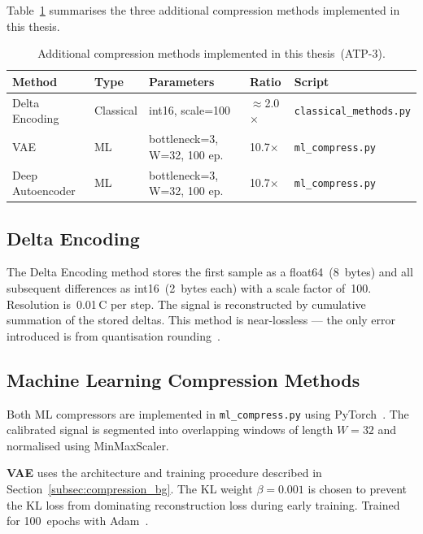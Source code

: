 Table~\ref{tab:compress_methods} summarises the three additional compression methods implemented in this thesis.

\begin{table}[H]
\centering
\caption{Additional compression methods implemented in this thesis~(ATP-3).}
\label{tab:compress_methods}
\begin{tabular}{lllll}
\toprule
\textbf{Method} & \textbf{Type} & \textbf{Parameters} & \textbf{Ratio} & \textbf{Script} \\
\midrule
Delta Encoding    & Classical & int16, scale=100            & $\approx$2.0$\times$ & \texttt{classical\_methods.py} \\
VAE               & ML        & bottleneck=3, W=32, 100 ep. & 10.7$\times$          & \texttt{ml\_compress.py} \\
Deep Autoencoder  & ML        & bottleneck=3, W=32, 100 ep. & 10.7$\times$          & \texttt{ml\_compress.py} \\
\bottomrule
\end{tabular}
\end{table}

\subsection{Delta Encoding}

The Delta Encoding method stores the first sample as a float64~(8~bytes) and all subsequent differences as int16~(2~bytes each) with a scale factor of~100. Resolution is~0.01\,\textdegree C per step. The signal is reconstructed by cumulative summation of the stored deltas. This method is near-lossless --- the only error introduced is from quantisation rounding~\cite{lossless_compression}.

\subsection{Machine Learning Compression Methods}

Both ML compressors are implemented in \texttt{ml\_compress.py} using PyTorch~\cite{pytorch}. The calibrated signal is segmented into overlapping windows of length $W=32$ and normalised using MinMaxScaler.

\textbf{VAE} uses the architecture and training procedure described in Section~\ref{subsec:compression_bg}. The KL weight $\beta=0.001$ is chosen to prevent the KL loss from dominating reconstruction loss during early training. Trained for 100~epochs with Adam~\cite{kingma2014adam}.

